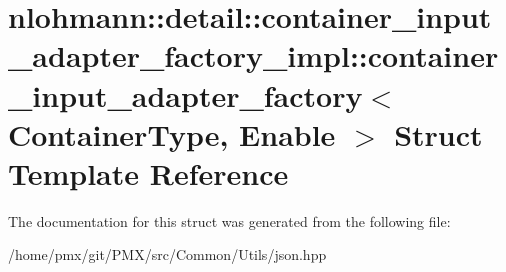 \hypertarget{structnlohmann_1_1detail_1_1container__input__adapter__factory__impl_1_1container__input__adapter__factory}{}\section{nlohmann\+:\+:detail\+:\+:container\+\_\+input\+\_\+adapter\+\_\+factory\+\_\+impl\+:\+:container\+\_\+input\+\_\+adapter\+\_\+factory$<$ Container\+Type, Enable $>$ Struct Template Reference}
\label{structnlohmann_1_1detail_1_1container__input__adapter__factory__impl_1_1container__input__adapter__factory}


The documentation for this struct was generated from the following file\+:\begin{DoxyCompactItemize}
\item 
/home/pmx/git/\+P\+M\+X/src/\+Common/\+Utils/json.\+hpp\end{DoxyCompactItemize}
